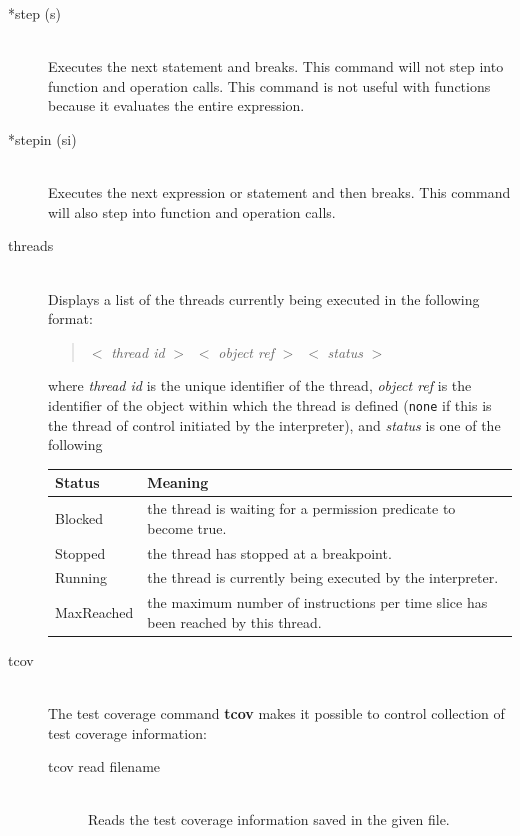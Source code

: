 \documentclass[\pformat,12pt]{article}
\begin{document}
\begin{description}
\item[*step (s)] \mbox{}\\
  Executes the next statement and breaks. This command will not step
  into function and operation calls. This command is not useful with
  functions because it evaluates the entire expression.

\item[*stepin (si)] \mbox{}\\
  Executes the next expression or statement and then breaks. This
  command will also step into function and operation calls.


\item[threads]\mbox{}\\
  Displays a list of the threads currently being executed in the
following format:
\begin{quote}
  $<$ \textit{thread id} $>$\ $<$ \textit{object ref} $>$\ $<$
\textit{status} $>$
\end{quote}
where \textit{thread id} is the unique identifier of the thread,
\textit{object ref} is the identifier of the object within which the
thread is defined (\texttt{none} if this is the thread of control
initiated by the interpreter), and \textit{status} is one of the following

\begin{tabular}{lp{10cm}}\hline
Status & Meaning \\ \hline
Blocked    & the thread is waiting for a permission predicate to
             become true. \\ 
Stopped    & the thread has stopped at a breakpoint.\\
Running    & the thread is currently being executed by the interpreter. \\
MaxReached & the maximum number of instructions per time slice has
              been reached by this thread. \\ \hline 
\end{tabular}

\item[tcov]\mbox{}\\
The test coverage command {\bf tcov} makes it possible to control 
collection of test coverage information:

  \begin{description}
  \item[tcov read filename]\mbox{}\\
    Reads the test coverage information saved in the given file.


\end{description}
\end{description}
\end{document}
